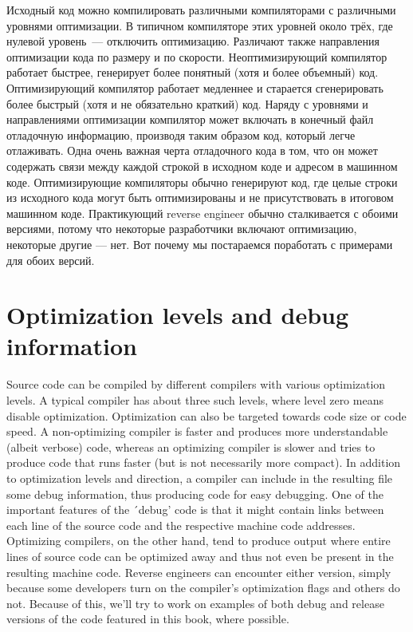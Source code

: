 Исходный код можно компилировать различными компиляторами с различными уровнями оптимизации.
В типичном компиляторе этих уровней около трёх, где нулевой уровень~--- отключить оптимизацию.
Различают также направления оптимизации кода по размеру и по скорости.
Неоптимизирующий компилятор работает быстрее, генерирует более понятный (хотя и более объемный) код.
Оптимизирующий компилятор работает медленнее и старается сгенерировать более быстрый (хотя и не обязательно краткий) код.
Наряду с уровнями и направлениями оптимизации компилятор может включать в конечный файл отладочную информацию,
производя таким образом код, который легче отлаживать.
Одна очень важная черта отладочного кода в том, что он может содержать
связи между каждой строкой в исходном коде и адресом в машинном коде.
Оптимизирующие компиляторы обычно генерируют код, где целые строки из исходного кода
могут быть оптимизированы и не присутствовать в итоговом машинном коде.
Практикующий reverse engineer обычно сталкивается с обоими версиями, потому что некоторые разработчики
включают оптимизацию, некоторые другие --- нет. Вот почему мы постараемся поработать с примерами для обоих версий.
\fi %

\ifdefined\ENGLISH
\section*{Optimization levels and debug information}

Source code can be compiled by different compilers with various optimization levels.
A typical compiler has about three such levels, where level zero means disable optimization.
Optimization can also be targeted towards code size or code speed.
A non-optimizing compiler is faster and produces more understandable (albeit verbose) code,
whereas an optimizing compiler is slower and tries to produce code that runs faster (but is not necessarily more compact).
In addition to optimization levels and direction, a compiler can include in the resulting file some debug information,
thus producing code for easy debugging.
One of the important features of the ´debug' code is that it might contain links
between each line of the source code and the respective machine code addresses.
Optimizing compilers, on the other hand, tend to produce output where entire lines of source code
can be optimized away and thus not even be present in the resulting machine code.
Reverse engineers can encounter either version, simply because some developers turn on the compiler's optimization flags and others do not. 
Because of this, we'll try to work on examples of both debug and release versions of the code featured in this book, where possible.
\fi %

